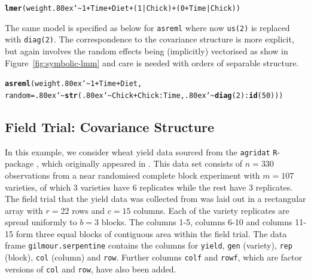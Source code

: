 \documentclass[runningheads]{llncs}\usepackage[]{graphicx}\usepackage[]{color}
\makeatletter
\newcommand{\hlnum}[1]{\textcolor[rgb]{0.686,0.059,0.569}{#1}}%
\newcommand{\hlopt}[1]{\textcolor[rgb]{0,0,0}{#1}}%
\newcommand{\hlstd}[1]{\textcolor[rgb]{0.345,0.345,0.345}{#1}}%
\newcommand{\hlkwc}[1]{\textcolor[rgb]{0.333,0.667,0.333}{#1}}%
\newcommand{\hlkwd}[1]{\textcolor[rgb]{0.737,0.353,0.396}{\textbf{#1}}}%
\newenvironment{kframe}{%
 \def\at@end@of@kframe{}%
 \ifinner\ifhmode%
  \def\at@end@of@kframe{\end{minipage}}%
  \begin{minipage}{\columnwidth}%
 \fi\fi%
 \def\FrameCommand##1{\hskip\@totalleftmargin \hskip-\fboxsep
 \colorbox{shadecolor}{##1}\hskip-\fboxsep
     \hskip-\linewidth \hskip-\@totalleftmargin \hskip\columnwidth}%
 \MakeFramed {\advance\hsize-\width
   \@totalleftmargin\z@ \linewidth\hsize
   \@setminipage}}%
 {\par\unskip\endMakeFramed%
 \at@end@of@kframe}
\newenvironment{knitrout}{}{} %
\newcommand{\mytilde}{\lower.80ex\hbox{\char`\~}}
\makeatother
\begin{document}
\begin{knitrout}
	\color{fgcolor}\begin{kframe}
		\begin{alltt}
			\hlkwd{lmer}\hlstd{(weight} \hlopt{\mytilde} \hlnum{1} \hlopt{+} \hlstd{Time} \hlopt{+} \hlstd{Diet} \hlopt{+} \hlstd{(}\hlnum{1} \hlopt{|} \hlstd{Chick)} \hlopt{+} \hlstd{(}\hlnum{0} \hlopt{+} \hlstd{Time} \hlopt{|} \hlstd{Chick))}
		\end{alltt}
	\end{kframe}
\end{knitrout}

The same model is specified as below for \texttt{asreml} where now \texttt{us(2)} is replaced with \texttt{diag(2)}. The correspondence to the covariance structure is more explicit, but again involves the random effects being (implicitly) vectorised as show in Figure~\ref{fig:symbolic-lmm} and care is needed with orders of separable structure.
\begin{knitrout}
	\color{fgcolor}\begin{kframe}
		\begin{alltt}
			\hlkwd{asreml}\hlstd{(weight} \hlopt{\mytilde} \hlnum{1} \hlopt{+} \hlstd{Time} \hlopt{+} \hlstd{Diet,}
			\hlkwc{random}\hlstd{=}\hlopt{\mytilde} \hlkwd{str}\hlstd{(}\hlopt{\mytilde}\hlstd{Chick} \hlopt{+} \hlstd{Chick}\hlopt{:}\hlstd{Time,} \hlopt{\mytilde}\hlkwd{diag}\hlstd{(}\hlnum{2}\hlstd{)}\hlopt{:}\hlkwd{id}\hlstd{(}\hlnum{50}\hlstd{)))}
		\end{alltt}
	\end{kframe}
\end{knitrout}



\hypertarget{atrial}{%
	\subsection{Field Trial: Covariance Structure}\label{atrial}}

In this example, we consider wheat yield data sourced from the \texttt{agridat} \texttt{R}-package \citep{agridat}, which  originally appeared in \citet{Gilmour1997}. This data set consists of $n=330$ observations from a near randomised complete block experiment with $m=107$ varieties, of which 3 varieties have 6 replicates while the rest have 3 replicates. The field trial that the yield data was collected from was laid out in a rectangular array with $r=22$ rows and $c=15$ columns. Each of the variety replicates are spread uniformly to $b=3$ blocks. The columns 1-5, columns 6-10 and columns 11-15 form three equal blocks of contiguous area within the field trial. The data frame \texttt{gilmour.serpentine} contains the columns for \texttt{yield}, \texttt{gen} (variety), \texttt{rep} (block), \texttt{col} (column) and \texttt{row}. Further columns \texttt{colf} and \texttt{rowf}, which are factor versions of \texttt{col} and \texttt{row}, have also been added.
\end{document}
